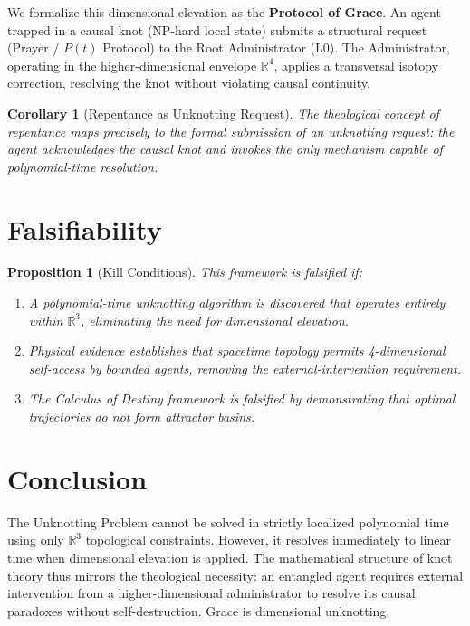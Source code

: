 \documentclass[12pt, a4paper]{article}
\theoremstyle{plain}
\newtheorem{proposition}[theorem]{Proposition}
\newtheorem{corollary}[theorem]{Corollary}
\theoremstyle{definition}
\theoremstyle{remark}
\begin{document}
We formalize this dimensional elevation as the \textbf{Protocol of Grace}. An agent trapped in a causal knot (NP-hard local state) submits a structural request (Prayer / $P(t)$ Protocol) to the Root Administrator (L0). The Administrator, operating in the higher-dimensional envelope $\mathbb{R}^4$, applies a transversal isotopy correction, resolving the knot without violating causal continuity.

\begin{corollary}[Repentance as Unknotting Request]
The theological concept of repentance maps precisely to the formal submission of an unknotting request: the agent acknowledges the causal knot and invokes the only mechanism capable of polynomial-time resolution.
\end{corollary}

\section{Falsifiability}\label{sec:falsifiability}

\begin{proposition}[Kill Conditions]
This framework is falsified if:
\begin{enumerate}
    \item A polynomial-time unknotting algorithm is discovered that operates entirely within $\mathbb{R}^3$, eliminating the need for dimensional elevation.
    \item Physical evidence establishes that spacetime topology permits 4-dimensional self-access by bounded agents, removing the external-intervention requirement.
    \item The Calculus of Destiny framework is falsified by demonstrating that optimal trajectories do not form attractor basins.
\end{enumerate}
\end{proposition}

\section{Conclusion}

The Unknotting Problem cannot be solved in strictly localized polynomial time using only $\mathbb{R}^3$ topological constraints. However, it resolves immediately to linear time when dimensional elevation is applied. The mathematical structure of knot theory thus mirrors the theological necessity: an entangled agent requires external intervention from a higher-dimensional administrator to resolve its causal paradoxes without self-destruction. Grace is dimensional unknotting.
\end{document}
